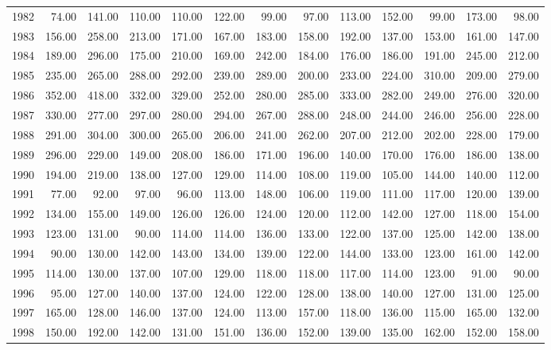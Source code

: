 \begin{longtable}{rrrrrrrrrrrrr}
  1982 & 74.00 & 141.00 & 110.00 & 110.00 & 122.00 & 99.00 & 97.00 & 113.00 & 152.00 & 99.00 & 173.00 & 98.00 \\ 
  1983 & 156.00 & 258.00 & 213.00 & 171.00 & 167.00 & 183.00 & 158.00 & 192.00 & 137.00 & 153.00 & 161.00 & 147.00 \\ 
  1984 & 189.00 & 296.00 & 175.00 & 210.00 & 169.00 & 242.00 & 184.00 & 176.00 & 186.00 & 191.00 & 245.00 & 212.00 \\ 
  1985 & 235.00 & 265.00 & 288.00 & 292.00 & 239.00 & 289.00 & 200.00 & 233.00 & 224.00 & 310.00 & 209.00 & 279.00 \\ 
  1986 & 352.00 & 418.00 & 332.00 & 329.00 & 252.00 & 280.00 & 285.00 & 333.00 & 282.00 & 249.00 & 276.00 & 320.00 \\ 
  1987 & 330.00 & 277.00 & 297.00 & 280.00 & 294.00 & 267.00 & 288.00 & 248.00 & 244.00 & 246.00 & 256.00 & 228.00 \\ 
  1988 & 291.00 & 304.00 & 300.00 & 265.00 & 206.00 & 241.00 & 262.00 & 207.00 & 212.00 & 202.00 & 228.00 & 179.00 \\ 
  1989 & 296.00 & 229.00 & 149.00 & 208.00 & 186.00 & 171.00 & 196.00 & 140.00 & 170.00 & 176.00 & 186.00 & 138.00 \\ 
  1990 & 194.00 & 219.00 & 138.00 & 127.00 & 129.00 & 114.00 & 108.00 & 119.00 & 105.00 & 144.00 & 140.00 & 112.00 \\ 
  1991 & 77.00 & 92.00 & 97.00 & 96.00 & 113.00 & 148.00 & 106.00 & 119.00 & 111.00 & 117.00 & 120.00 & 139.00 \\ 
  1992 & 134.00 & 155.00 & 149.00 & 126.00 & 126.00 & 124.00 & 120.00 & 112.00 & 142.00 & 127.00 & 118.00 & 154.00 \\ 
  1993 & 123.00 & 131.00 & 90.00 & 114.00 & 114.00 & 136.00 & 133.00 & 122.00 & 137.00 & 125.00 & 142.00 & 138.00 \\ 
  1994 & 90.00 & 130.00 & 142.00 & 143.00 & 134.00 & 139.00 & 122.00 & 144.00 & 133.00 & 123.00 & 161.00 & 142.00 \\ 
  1995 & 114.00 & 130.00 & 137.00 & 107.00 & 129.00 & 118.00 & 118.00 & 117.00 & 114.00 & 123.00 & 91.00 & 90.00 \\ 
  1996 & 95.00 & 127.00 & 140.00 & 137.00 & 124.00 & 122.00 & 128.00 & 138.00 & 140.00 & 127.00 & 131.00 & 125.00 \\ 
  1997 & 165.00 & 128.00 & 146.00 & 137.00 & 124.00 & 113.00 & 157.00 & 118.00 & 136.00 & 115.00 & 165.00 & 132.00 \\ 
  1998 & 150.00 & 192.00 & 142.00 & 131.00 & 151.00 & 136.00 & 152.00 & 139.00 & 135.00 & 162.00 & 152.00 & 158.00 \\ 

\end{longtable}
